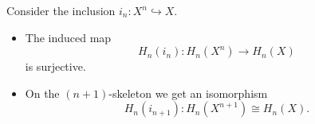 \documentclass[main.tex]{subfiles}
\begin{document}
\begin{lemma}
  \label{lemma:homology_of_inclusion_of_n_skeleton}
  Consider the inclusion $i_{n}\colon X^{n} \hookrightarrow X$.
  \begin{itemize}
    \item The induced map
      \begin{equation*}
        H_{n}(i_{n})\colon H_{n}(X^{n}) \to H_{n}(X)
      \end{equation*}
      is surjective.


    \item On the $(n+1)$-skeleton we get an isomorphism
      \begin{equation*}
        H_{n}(i_{n+1})\colon H_{n}(X^{n+1}) \cong H_{n}(X).
      \end{equation*}
  \end{itemize}
\end{lemma}
\end{document}
